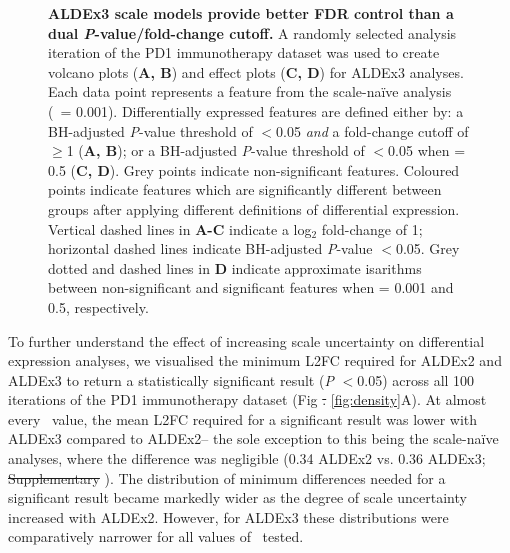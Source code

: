 \documentclass[10pt,letterpaper]{article}
\providecommand{\DIFdeltex}[1]{{\protect\color{red}\sout{#1}}}                      %
\providecommand{\DIFdelbegin}{} %
\providecommand{\DIFdelend}{} %
\providecommand{\DIFdel}[1]{\texorpdfstring{\DIFdeltex{#1}}{}} %
\newcommand{\DIFscaledelfig}{0.5}
\newlength{\DIFdelgraphicswidth} %
\newlength{\DIFdelgraphicsheight} %
\newcommand{\DIFdelincludegraphics}[2][]{%
\sbox{\DIFdelgraphicsbox}{\DIFOincludegraphics[#1]{#2}}%
\settoboxwidth{\DIFdelgraphicswidth}{\DIFdelgraphicsbox} %
\settoboxtotalheight{\DIFdelgraphicsheight}{\DIFdelgraphicsbox} %
\scalebox{\DIFscaledelfig}{%
\parbox[b]{\DIFdelgraphicswidth}{\usebox{\DIFdelgraphicsbox}\\[-\baselineskip] \rule{\DIFdelgraphicswidth}{0em}}\llap{\resizebox{\DIFdelgraphicswidth}{\DIFdelgraphicsheight}{%
\setlength{\unitlength}{\DIFdelgraphicswidth}%
\begin{picture}(1,1)%
\thicklines\linethickness{2pt} %
{\color[rgb]{1,0,0}\put(0,0){\framebox(1,1){}}}%
{\color[rgb]{1,0,0}\put(0,0){\line( 1,1){1}}}%
{\color[rgb]{1,0,0}\put(0,1){\line(1,-1){1}}}%
\end{picture}%
}\hspace*{3pt}}} %
} %
\DeclareRobustCommand{\DIFdelbegin}{\DIFOdelbegin \let\includegraphics\DIFdelincludegraphics} %
\DeclareRobustCommand{\DIFdelend}{\DIFOaddend \let\includegraphics\DIFOincludegraphics} %
\begin{document}
\begin{figure}[H]
    \centering
    \caption{\textbf{ALDEx3 scale models provide better FDR control than a dual \textit{P}-value/fold-change cutoff.} A randomly selected analysis iteration of the PD1 immunotherapy dataset was used to create volcano plots (\textbf{A, B}) and effect plots (\textbf{C, D}) for ALDEx3 analyses. Each data point represents a feature from the scale-na\"ive analysis (\textgamma~= 0.001). Differentially expressed features are defined either by: a BH-adjusted \textit{P}-value threshold of $<$0.05 \textit{and} a fold-change cutoff of $\geq$1 (\textbf{A, B}); or a BH-adjusted \textit{P}-value threshold of $<$0.05 when \textgamma = 0.5 (\textbf{C, D}). Grey points indicate non-significant features. Coloured points indicate features which are significantly different between groups after applying different definitions of differential expression. Vertical dashed lines in \textbf{A-C} indicate a log$_2$ fold-change of 1; horizontal dashed lines indicate BH-adjusted \textit{P}-value $<$0.05. Grey dotted and dashed lines in \textbf{D} indicate approximate isarithms between non-significant and significant features when \textgamma{} = 0.001 and 0.5, respectively.}
    \label{fig:volcanoEffect}
\end{figure}

To further understand the effect of increasing scale uncertainty on differential expression analyses, we visualised the minimum L2FC required for ALDEx2 and ALDEx3 to return a statistically significant result (\textit{P} $<$0.05) across all 100 iterations of the PD1 immunotherapy dataset (Fig \DIFdelbegin \DIFdel{. }\DIFdelend \ref{fig:density}A). At almost every \textgamma~value, the mean L2FC required for a significant result was lower with ALDEx3 compared to ALDEx2-- the sole exception to this being the scale-na\"ive analyses, where the difference was negligible (0.34 ALDEx2 vs. 0.36 ALDEx3;  \DIFdelbegin \DIFdel{Supplementary }\DIFdelend {}). The distribution of minimum differences needed for a significant result became markedly wider as the degree of scale uncertainty increased with ALDEx2. However, for ALDEx3 these distributions were comparatively narrower for all values of \textgamma~tested.
\end{document}
